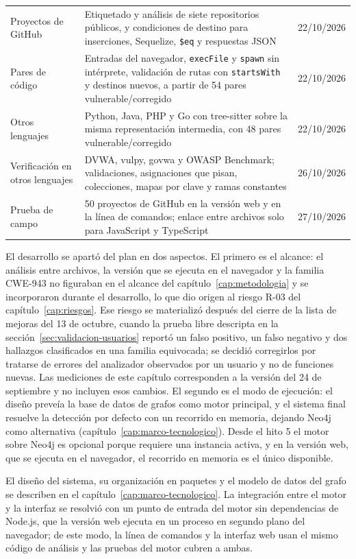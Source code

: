 \begin{table}[H]
\begin{tabularx}{\textwidth}{l L l}
        Proyectos de GitHub & Etiquetado y análisis de siete repositorios públicos, y condiciones de destino para inserciones, Sequelize, \texttt{\$eq} y respuestas JSON & 22/10/2026 \\
        Pares de código & Entradas del navegador, \texttt{execFile} y \texttt{spawn} sin intérprete, validación de rutas con \texttt{startsWith} y destinos nuevos, a partir de 54 pares vulnerable/corregido & 22/10/2026 \\
        Otros lenguajes & Python, Java, PHP y Go con tree-sitter sobre la misma representación intermedia, con 48 pares vulnerable/corregido & 22/10/2026 \\
        Verificación en otros lenguajes & DVWA, vulpy, govwa y OWASP Benchmark; validaciones, asignaciones que pisan, colecciones, mapas por clave y ramas constantes & 26/10/2026 \\
        Prueba de campo & 50 proyectos de GitHub en la versión web y en la línea de comandos; enlace entre archivos solo para JavaScript y TypeScript & 27/10/2026 \\
        \bottomrule
    \end{tabularx}
\end{table}

El desarrollo se apartó del plan en dos aspectos. El primero es el
alcance: el análisis entre archivos, la versión que se ejecuta en el
navegador y la familia CWE-943 no figuraban en el alcance del
capítulo~\ref{cap:metodologia} y se incorporaron durante el desarrollo,
lo que dio origen al riesgo R-03 del capítulo~\ref{cap:riesgos}. Ese
riesgo se materializó después del cierre de la lista de mejoras del 13
de octubre, cuando la prueba libre descripta en la
sección~\ref{sec:validacion-usuarios} reportó un falso positivo, un
falso negativo y dos hallazgos clasificados en una familia equivocada; se
decidió corregirlos por tratarse de errores del analizador observados
por un usuario y no de funciones nuevas. Las mediciones de este capítulo
corresponden a la versión del 24 de septiembre y no incluyen esos
cambios. El
segundo es el modo de ejecución: el diseño preveía la base de datos de
grafos como motor principal, y el sistema final resuelve la detección por
defecto con un recorrido en memoria, dejando Neo4j como alternativa
(capítulo~\ref{cap:marco-tecnologico}). Desde el hito 5 el motor sobre
Neo4j es opcional porque requiere una instancia activa, y en la versión
web, que se ejecuta en el navegador, el recorrido en memoria es el único
disponible.

El diseño del sistema, su organización en paquetes y el modelo de datos
del grafo se describen en el capítulo~\ref{cap:marco-tecnologico}. La
integración entre el motor y la interfaz se resolvió con un punto de
entrada del motor sin dependencias de Node.js, que la versión web ejecuta
en un proceso en segundo plano del navegador; de este modo, la línea de
comandos y la interfaz web usan el mismo código de análisis y las pruebas
del motor cubren a ambas.

